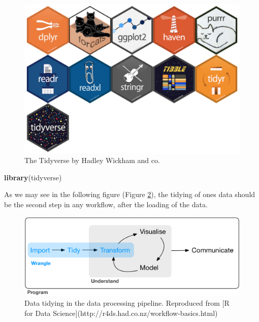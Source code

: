 \documentclass[]{book}
\newenvironment{Shaded}{\begin{snugshade}}{\end{snugshade}}
\newcommand{\KeywordTok}[1]{\textcolor[rgb]{0.13,0.29,0.53}{\textbf{#1}}}
\newcommand{\NormalTok}[1]{#1}
\theoremstyle{definition}
\theoremstyle{definition}
\theoremstyle{definition}
\theoremstyle{remark}
\begin{document}
\begin{figure}

{\centering \includegraphics[width=1\linewidth]{figures/tidyverse} 

}

\caption{The Tidyverse by Hadley Wickham and co.}\label{fig:tidyverse}
\end{figure}

\begin{Shaded}
\begin{Highlighting}[]
\KeywordTok{library}\NormalTok{(tidyverse)}
\end{Highlighting}
\end{Shaded}

As we may see in the following figure (Figure \ref{fig:tidy}), the
tidying of ones data should be the second step in any workflow, after
the loading of the data.

\begin{figure}

{\centering \includegraphics[width=1\linewidth]{figures/data-science-wrangle} 

}

\caption{Data tidying in the data processing pipeline. Reproduced from [R for Data Science](http://r4ds.had.co.nz/workflow-basics.html)}\label{fig:tidy}
\end{figure}
\end{document}
